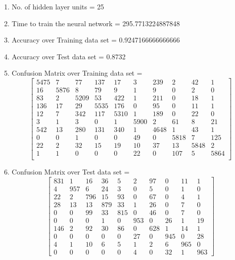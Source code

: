 \documentclass[11pt]{article}
\begin{document}
\hline
\begin{enumerate}
\item No. of hidden layer units = 25
\item Time to train the neural network = 295.7713224887848
\item Accuracy over Training data set = 0.9247166666666666
\item Accuracy over Test data set = 0.8732
\item Confusion Matrix over Training data set = 
\begin{equation}
  \begin{bmatrix}
5475 & 7 & 77 & 137 & 17 & 3 & 239 & 2 & 42 & 1\\
16 & 5876 & 8 & 79 & 9 & 1 & 9 & 0 & 2 & 0\\
83 & 2 & 5209 & 53 & 422 & 1 & 211 & 0 & 18 & 1\\
136 & 17 & 29 & 5535 & 176 & 0 & 95 & 0 & 11 & 1\\
12 & 7 & 342 & 117 & 5310 & 1 & 189 & 0 & 22 & 0\\
3 & 1 & 3 & 0 & 1 & 5900 & 2 & 61 & 8 & 21\\
542 & 13 & 280 & 131 & 340 & 1 & 4648 & 1 & 43 & 1\\
0 & 0 & 1 & 0 & 0 & 49 & 0 & 5818 & 7 & 125\\
22 & 2 & 32 & 15 & 19 & 10 & 37 & 13 & 5848 & 2\\
1 & 1 & 0 & 0 & 0 & 22 & 0 & 107 & 5 & 5864\\
\end{bmatrix}
\end{equation}
\item Confusion Matrix over Test data set = 
\begin{equation}
  \begin{bmatrix}
831 & 1 & 16 & 36 & 5 & 2 & 97 & 0 & 11 & 1\\
4 & 957 & 6 & 24 & 3 & 0 & 5 & 0 & 1 & 0\\
22 & 2 & 796 & 15 & 93 & 0 & 67 & 0 & 4 & 1\\
28 & 13 & 13 & 879 & 33 & 1 & 26 & 0 & 7 & 0\\
0 & 0 & 99 & 33 & 815 & 0 & 46 & 0 & 7 & 0\\
0 & 0 & 0 & 1 & 0 & 953 & 0 & 26 & 1 & 19\\
146 & 2 & 92 & 30 & 86 & 0 & 628 & 1 & 14 & 1\\
0 & 0 & 0 & 0 & 0 & 27 & 0 & 945 & 0 & 28\\
4 & 1 & 10 & 6 & 5 & 1 & 2 & 6 & 965 & 0\\
0 & 0 & 0 & 0 & 0 & 4 & 0 & 32 & 1 & 963
  \end{bmatrix}
\end{equation}
\end{enumerate}
\end{document}
